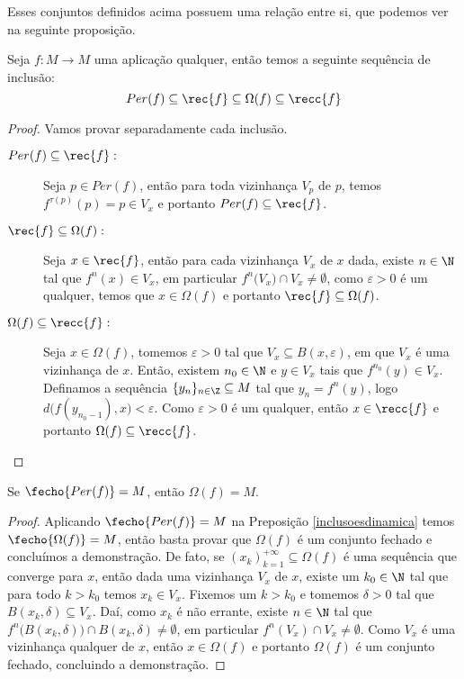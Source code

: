 Esses conjuntos definidos acima possuem uma relação entre si, que podemos ver na seguinte proposição.

\begin{proposicao}\label{inclusoesdinamica} Seja $f:M\to M$ uma aplicação qualquer, então temos a seguinte sequência de inclusão: $${Per(f)}\subseteq\rec{f}\subseteq\Omega(f)\subseteq\recc{f}$$
\end{proposicao}

\begin{proof} Vamos provar separadamente cada inclusão.
\begin{description}
\item[${Per(f)}\subseteq\rec{f}:$] Seja $p\in{Per(f)}$, então para toda vizinhança $V_p$ de $p$, temos $f^{\tau(p)}(p)=p\in V_x$ e portanto $Per(f)\subseteq\rec{f}$.

\item[$\rec{f}\subseteq\Omega(f):$] Seja $x\in\rec{f}$, então para cada vizinhança $V_x$ de $x$ dada, existe $n\in\N$ tal que $f^n(x)\in V_x$, em particular $f^n\big(V_x\big)\cap V_x\neq\emptyset$, como $\varepsilon>0$ é um qualquer, temos que $x\in\Omega(f)$ e portanto $\rec{f}\subseteq\Omega(f)$.

\item[$\Omega(f)\subseteq\recc{f}:$] Seja $x\in\Omega(f)$, tomemos $\varepsilon>0$ tal que $V_x\subseteq B(x,\varepsilon)$, em que $V_x$ é uma vizinhança de $x$. Então, existem $n_0\in\N$ e $y\in V_x$ tais que $f^{n_0}(y)\in V_x$. Definamos a sequência $\{y_n\}_{n\in\Z}\subseteq M$ tal que $y_n=f^n(y)$, logo $d\big(f(y_{n_0-1}),x\big)<\varepsilon$. Como $\varepsilon>0$ é um qualquer, então $x\in \recc{f}$ e portanto $\Omega(f)\subseteq\recc{f}$.
\end{description}
\end{proof}

\begin{corolario} Se $\fecho{Per(f)}=M$, então $\Omega(f)=M$.
\end{corolario}

\begin{proof} Aplicando $\fecho{Per(f)}=M$ na Preposição \ref{inclusoesdinamica} temos $\fecho{\Omega(f)}= M$, então basta provar que ${\Omega(f)}$ é um conjunto fechado e concluímos a demonstração. De fato, se $(x_k)_{k=1}^{+\infty}\subseteq\Omega(f)$ é uma sequência que converge para $x$, então dada uma vizinhança $V_x$ de $x$, existe um $k_0\in\N$ tal que para todo $k>k_0$ temos $x_k\in V_x$. Fixemos um $k>k_0$ e tomemos $\delta>0$ tal que $B(x_k,\delta)\subseteq V_x$. Daí, como $x_k$ é não errante, existe $n\in\N$ tal que $f^n\big(B(x_k,\delta)\big)\cap B(x_k,\delta)\neq\emptyset$, em particular $f^n(V_x)\cap V_x\neq\emptyset$. Como $V_x$ é uma vizinhança qualquer de $x$, então $x\in\Omega(f)$ e portanto $\Omega(f)$ é um conjunto fechado, concluindo a demonstração.
\end{proof}

